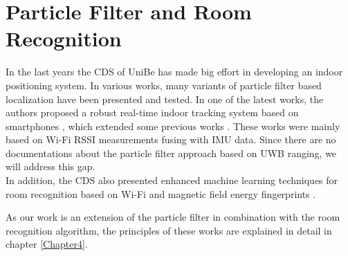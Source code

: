
\section{Particle Filter and Room Recognition}

In the last years the CDS of UniBe has made big effort in developing an indoor positioning system. In various works, many variants of particle filter based localization have been presented and tested. In one of the latest works, the authors proposed a robust real-time indoor tracking system based on smartphones \cite{Carrera}, which extended some previous works \cite{Carrera3}. These works were mainly based on Wi-Fi RSSI measurements fusing with IMU data. Since there are no documentations about the particle filter approach based on UWB ranging, we will address this gap.\\
In addition, the CDS also presented enhanced machine learning techniques for room recognition based on Wi-Fi and magnetic field energy fingerprints \cite{Carrera2}.

As our work is an extension of the particle filter in combination with the room recognition algorithm, the principles of these works are explained in detail in chapter \ref{Chapter4}. 



